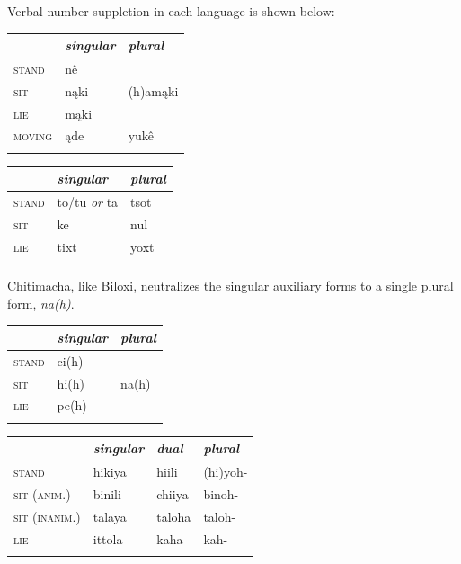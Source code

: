 \documentclass[output=paper]{LSP/langsci}
\begin{document}
	Verbal number suppletion in each language is shown below:

\ea
{\hspace{1em}}\newline
\settowidth{}
\begin{tabular}{lll}
\hhline{===}& \emph{singular} & \emph{plural}
\\ \hline \textsc{stand} & nê\footnotemark & \multirow{3}{*}{(h)amąki}
\\ \textsc{sit} & nąki & 
\\ \textsc{lie} & mąki & 
\\ \textsc{moving} & ąde & yukê 
\\ \hhline{===}
\end{tabular} 
\z

\ea
{\hspace{1em}}\newline
\settowidth{}
\begin{tabular}{lll}
\hhline{===}& \emph{singular} & \emph{plural}
\\ \hline \textsc{stand} & to/tu \emph{or} ta\footnotemark & tsot
\\ \textsc{sit} & ke & nul 
\\ \textsc{lie} & tixt & yoxt 
\\ \hhline{===}
\end{tabular} 
\z

Chitimacha, like Biloxi, neutralizes the singular auxiliary forms to a single plural form, \emph{na(h)}.

\ea
{\hspace{1em}}\newline
\settowidth{}
\begin{tabular}{lll}
\hhline{===}& \emph{singular} & \emph{plural}
\\ \hline \textsc{stand} & ci(h)\footnotemark & \multirow{3}{*}{na(h)}
\\ \textsc{sit} & hi(h) & 
\\ \textsc{lie} & pe(h) & 
\\ \hhline{===}
\end{tabular} 
\z

\ea
{\hspace{1em}}\newline
\settowidth{}
\begin{tabular}{llll}
\hhline{====}& \emph{singular} & \emph{dual} & \emph{plural}
\\ \hline \textsc{stand} & hikiya\footnotemark & hiili & (hi)yoh-
\\ \textsc{sit (anim.)} & binili & chiiya & binoh- 
\\ \textsc{sit (inanim.)} & talaya & taloha & taloh- 
\\ \textsc{lie} & ittola & kaha & kah- 
\\ \hhline{====}
\end{tabular} 
\z
\end{document}
